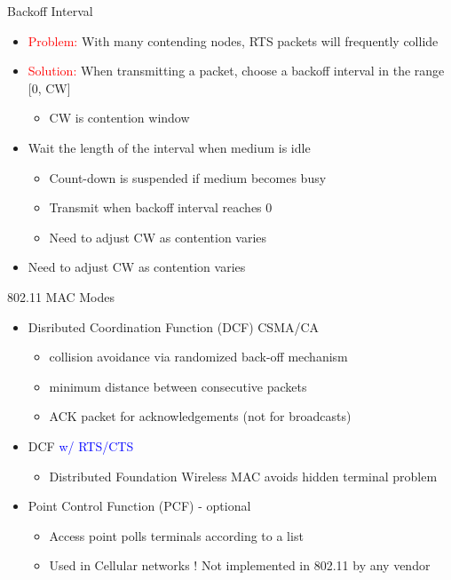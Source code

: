 \documentclass[pdf]{beamer}
\begin{document}
\begin{frame}{Backoff Interval}
\begin{itemize}
\item \textcolor{red}{ Problem:} With many contending nodes, RTS
   packets will frequently collide
 \item \textcolor{red}{Solution:} When transmitting a packet, choose a
   backoff interval in the range [0, CW]   
   \begin{itemize}
   \item CW is contention window     
   \end{itemize}
 \item  Wait the length of the interval when medium is idle
   \begin{itemize}
   \item Count-down is suspended if medium becomes busy    
   \item Transmit when backoff interval reaches 0   
   \item Need to adjust CW as contention varies
   \end{itemize}
\item   Need to adjust CW as contention varies
\end{itemize}

\end{frame}

\begin{frame}{802.11 MAC Modes}
  \begin{itemize}
  \item Disributed Coordination Function (DCF) CSMA/CA
    \begin{itemize}
    \item collision avoidance via randomized back-off mechanism
    \item minimum distance between consecutive packets
    \item ACK packet for acknowledgements (not for broadcasts)
    \end{itemize}
\item   DCF \textcolor{blue}{w/ RTS/CTS}
   \begin{itemize}
   \item   Distributed Foundation Wireless MAC avoids hidden terminal problem    
   \end{itemize}
\item   Point Control Function (PCF) - optional
  \begin{itemize}
  \item Access point polls terminals according to a list    
  \item Used in Cellular networks ! Not implemented in 802.11 by any
    vendor 
  \end{itemize}
\end{itemize}
\end{frame}
\end{document}
